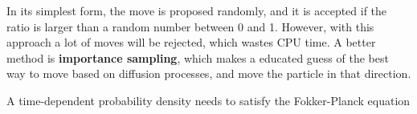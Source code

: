 In its simplest form, the move is proposed randomly, and it is accepted if the ratio is larger than a random number between 0 and 1. However, with this approach a lot of moves will be rejected, which wastes CPU time. A better method is \textbf{importance sampling}, which makes a educated guess of the best way to move based on diffusion processes, and move the particle in that direction. 

A time-dependent probability density needs to satisfy the Fokker-Planck equation 